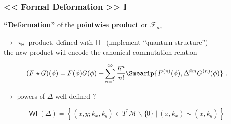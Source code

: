 \documentclass[9pt]{beamer}
\newcommand{\Fcal}{\mathcal{F}}
\newcommand{\Hsf}{\mathsf{H}}
\newcommand{\csf}{\mathsf{c}}
\begin{document}
\begin{frame}

\frametitle{<< Formal Deformation >> I}

\textbf{``Deformation''} of the \textbf{pointwise product} on $\Fcal_{\mu\csf}$

\vfill

$\to$ $\star_\Hsf$ product, defined with $\Hsf_+$ (implement ``quantum structure'') \\[2pt]

the new product will encode the canonical commutation relation

\vfill

\begin{block}{\vspace*{-3ex}}
\begin{equation*}
 (F \star G)(\phi) = F(\phi) G(\phi) + \sum_{n=1}^\infty \frac{\hbar^n}{n!} \Smearip{F^{(n)}(\phi), \Delta^{\otimes n} G^{(n)}(\phi)} \ .
\end{equation*}
\end{block}

\vfill

$\to$ powers of $\Delta$ well defined ? 

\vfill

\begin{equation*}
\mathsf{WF}(\Delta) = \left\{ (x,y;k_x,k_y) \in T^\ast \mathcal{M} \backslash \{0\} \ | \ (x,k_x) \sim (x,k_y) \right\} 
\end{equation*}

\vfill

\end{frame}  

\end{document}
